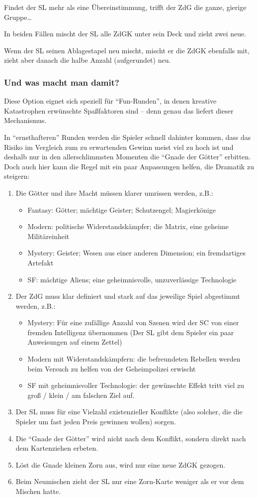 Findet der SL mehr als eine Übereinstimmung, trifft der ZdG die ganze, gierige Gruppe\dots

In beiden Fällen mischt der SL alle ZdGK unter sein Deck und zieht zwei neue.

Wenn der SL seinen Ablagestapel neu mischt, mischt er die ZdGK ebenfalls mit, zieht aber danach die halbe Anzahl (aufgerundet) neu.

\subsubsection{Und was macht man damit?}

Diese Option eignet sich speziell für "`Fun-Runden"', in denen kreative Katastrophen erwünschte Spaßfaktoren sind -- denn genau das liefert dieser Mechanismus.

In "`ernsthafteren"' Runden werden die Spieler schnell dahinter kommen, dass das Risiko im Vergleich zum zu erwartenden Gewinn meist viel zu hoch ist und deshalb nur in den allerschlimmsten Momenten die "`Gnade der Götter"' erbitten. Doch auch hier kann die Regel mit ein paar Anpassungen helfen, die Dramatik zu steigern:
\begin{enumerate}
\item Die Götter und ihre Macht müssen klarer umrissen werden, z.B.:
\begin{itemize}
\item Fantasy: Götter; mächtige Geister; Schutzengel; Magierkönige
\item Modern: politische Widerstandskämpfer; die Matrix, eine geheime Militäreinheit
\item Mystery: Geister; Wesen aus einer anderen Dimension; ein fremdartiges Artefakt
\item SF: mächtige Aliens; eine geheimnisvolle, unzuverlässige Technologie
\end{itemize}
\item Der ZdG muss klar definiert und stark auf das jeweilige Spiel abgestimmt werden, z.B.:
\begin{itemize}
\item Mystery: Für eine zufällige Anzahl von Szenen wird der SC von einer fremden Intelligenz übernommen (Der SL gibt dem Spieler ein paar Anweisungen auf einem Zettel)
\item Modern mit Widerstandskämpfern: die befreundeten Rebellen werden beim Versuch zu helfen von der Geheimpolizei erwischt
\item SF mit geheimnisvoller Technologie: der gewünschte Effekt tritt viel zu groß / klein / am falschen Ziel auf.
\end{itemize}
\item Der SL muss für eine Vielzahl existenzieller Konflikte (also solcher, die die Spieler um fast jeden Preis gewinnen wollen) sorgen.
\item Die "`Gnade der Götter"' wird nicht nach dem Konflikt, sondern direkt nach dem Kartenziehen erbeten.
\item Löst die Gnade kleinen Zorn aus, wird nur eine neue ZdGK gezogen.
\item Beim Neumischen zieht der SL nur eine Zorn-Karte weniger als er vor dem Mischen hatte.
\end{enumerate}

